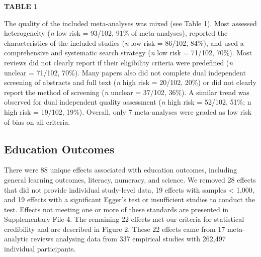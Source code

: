 \documentclass[
  english,
  man]{apa6}
\begin{document}
\textbf{TABLE 1}

The quality of the included meta-analyses was mixed (see Table 1).
Most assessed heterogeneity (\emph{n} low risk = 93/102, 91\% of meta-analyses), reported the characteristics of the included studies (\emph{n} low risk = 86/102, 84\%), and used a comprehensive and systematic search strategy (\emph{n} low risk = 71/102, 70\%).
Most reviews did not clearly report if their eligibility criteria were predefined (\emph{n} unclear = 71/102, 70\%).
Many papers also did not complete dual independent screening of abstracts and full text (\emph{n} high risk = 20/102, 20\%) or did not clearly report the method of screening (\emph{n} unclear = 37/102, 36\%).
A similar trend was observed for dual independent quality assessment (\emph{n} high risk = 52/102, 51\%; n high risk = 19/102, 19\%).
Overall, only 7 meta-analyses were graded as low risk of bias on all criteria.

\hypertarget{education-outcomes}{%
\subsection{Education Outcomes}\label{education-outcomes}}

There were 88 unique effects associated with education outcomes, including general learning outcomes, literacy, numeracy, and science.
We removed 28 effects that did not provide individual study-level data, 19 effects with samples \textless{} 1,000, and 19 effects with a significant Egger's test or insufficient studies to conduct the test.
Effects not meeting one or more of these standards are presented in Supplementary File 4.
The remaining 22 effects met our criteria for statistical credibility and are described in Figure 2.
These 22 effects came from 17 meta-analytic reviews analysing data from 337 empirical studies with 262,497 individual participants.
\end{document}
